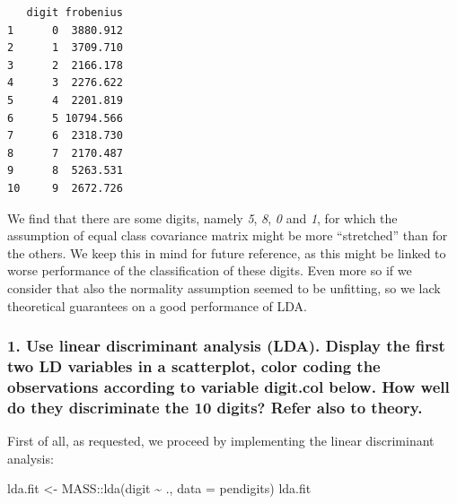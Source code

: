 \documentclass[
  letterpaper,
  DIV=11,
  numbers=noendperiod]{scrartcl}
\newenvironment{Shaded}{\begin{snugshade}}{\end{snugshade}}
\newcommand{\AttributeTok}[1]{\textcolor[rgb]{0.40,0.45,0.13}{#1}}
\newcommand{\FunctionTok}[1]{\textcolor[rgb]{0.28,0.35,0.67}{#1}}
\newcommand{\NormalTok}[1]{\textcolor[rgb]{0.00,0.23,0.31}{#1}}
\newcommand{\OtherTok}[1]{\textcolor[rgb]{0.00,0.23,0.31}{#1}}
\newcommand{\SpecialCharTok}[1]{\textcolor[rgb]{0.37,0.37,0.37}{#1}}
\begin{document}
\begin{verbatim}
   digit frobenius
1      0  3880.912
2      1  3709.710
3      2  2166.178
4      3  2276.622
5      4  2201.819
6      5 10794.566
7      6  2318.730
8      7  2170.487
9      8  5263.531
10     9  2672.726
\end{verbatim}

We find that there are some digits, namely \emph{5}, \emph{8}, \emph{0}
and \emph{1}, for which the assumption of equal class covariance matrix
might be more ``stretched'' than for the others. We keep this in mind
for future reference, as this might be linked to worse performance of
the classification of these digits. Even more so if we consider that
also the normality assumption seemed to be unfitting, so we lack
theoretical guarantees on a good performance of LDA.

\hypertarget{use-linear-discriminant-analysis-lda.-display-the-first-two-ld-variables-in-a-scatterplot-color-coding-the-observations-according-to-variable-digit.col-below.-how-well-do-they-discriminate-the-10-digits-refer-also-to-theory.}{%
\subsubsection{1. Use linear discriminant analysis (LDA). Display the
first two LD variables in a scatterplot, color coding the observations
according to variable digit.col below. How well do they discriminate the
10 digits? Refer also to
theory.}\label{use-linear-discriminant-analysis-lda.-display-the-first-two-ld-variables-in-a-scatterplot-color-coding-the-observations-according-to-variable-digit.col-below.-how-well-do-they-discriminate-the-10-digits-refer-also-to-theory.}}

First of all, as requested, we proceed by implementing the linear
discriminant analysis:

\begin{Shaded}
\begin{Highlighting}[]
\NormalTok{lda.fit }\OtherTok{\textless{}{-}}\NormalTok{ MASS}\SpecialCharTok{::}\FunctionTok{lda}\NormalTok{(digit }\SpecialCharTok{\textasciitilde{}}\NormalTok{ ., }\AttributeTok{data =}\NormalTok{ pendigits)}
\NormalTok{lda.fit}
\end{Highlighting}
\end{Shaded}
\end{document}
